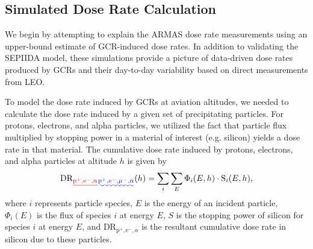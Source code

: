 \documentclass[draft]{agujournal2019}
\providecommand{\DIFadd}[1]{{\protect\color{blue}\uwave{#1}}} %
\providecommand{\DIFdel}[1]{{\protect\color{red}\sout{#1}}}                      %
\providecommand{\DIFaddbegin}{} %
\providecommand{\DIFaddend}{} %
\providecommand{\DIFdelbegin}{} %
\providecommand{\DIFdelend}{} %
\newcommand{\DIFscaledelfig}{0.5}
\newlength{\DIFdelgraphicswidth} %
\newlength{\DIFdelgraphicsheight} %
\newcommand{\DIFaddincludegraphics}[2][]{{\color{blue}\fbox{\DIFOincludegraphics[#1]{#2}}}} %
\newcommand{\DIFdelincludegraphics}[2][]{%
\sbox{\DIFdelgraphicsbox}{\DIFOincludegraphics[#1]{#2}}%
\settoboxwidth{\DIFdelgraphicswidth}{\DIFdelgraphicsbox} %
\settoboxtotalheight{\DIFdelgraphicsheight}{\DIFdelgraphicsbox} %
\scalebox{\DIFscaledelfig}{%
\parbox[b]{\DIFdelgraphicswidth}{\usebox{\DIFdelgraphicsbox}\\[-\baselineskip] \rule{\DIFdelgraphicswidth}{0em}}\llap{\resizebox{\DIFdelgraphicswidth}{\DIFdelgraphicsheight}{%
\setlength{\unitlength}{\DIFdelgraphicswidth}%
\begin{picture}(1,1)%
\thicklines\linethickness{2pt} %
{\color[rgb]{1,0,0}\put(0,0){\framebox(1,1){}}}%
{\color[rgb]{1,0,0}\put(0,0){\line( 1,1){1}}}%
{\color[rgb]{1,0,0}\put(0,1){\line(1,-1){1}}}%
\end{picture}%
}\hspace*{3pt}}} %
} %
\DeclareRobustCommand{\DIFaddbegin}{\DIFOaddbegin \let\includegraphics\DIFaddincludegraphics} %
\DeclareRobustCommand{\DIFaddend}{\DIFOaddend \let\includegraphics\DIFOincludegraphics} %
\DeclareRobustCommand{\DIFdelbegin}{\DIFOdelbegin \let\includegraphics\DIFdelincludegraphics} %
\DeclareRobustCommand{\DIFdelend}{\DIFOaddend \let\includegraphics\DIFOincludegraphics} %
\begin{document}
\subsection{Simulated Dose Rate Calculation}
\label{section:model:doserate_conversion}
We begin by attempting to explain the ARMAS dose rate measurements using an upper-bound estimate of GCR-induced dose rates. In addition to validating the SEPIIDA model, these simulations provide a picture of data-driven dose rates produced by GCRs and their day-to-day variability based on direct measurements from LEO.

To model the dose rate induced by GCRs at aviation altitudes, we needed to calculate the dose rate induced by a given set of precipitating particles. For protons, electrons, \DIFaddbegin \DIFadd{muons, }\DIFaddend and alpha particles, we utilized the fact that particle flux multiplied by stopping power in a material of interest (e.g. silicon) yields a dose rate in that material. The cumulative dose rate induced by protons, electrons, \DIFaddbegin \DIFadd{muons, }\DIFaddend and alpha particles at altitude $h$ is given by
%
\begin{equation}
  \text{DR}\DIFdelbegin \DIFdel{_{\text{p}^+,\text{e}^-,\alpha}}\DIFdelend \DIFaddbegin \DIFadd{_{\text{p}^+,\text{e}^-,\mu^-,\alpha}}\DIFaddend (h) = \sum_i \sum_E \Phi_i(E,h) \cdot \text{S}_i(E,h),
\end{equation}
%
\noindent where $i$ represents particle species, $E$ is the energy of an incident particle, $\Phi_i(E)$ is the flux of species $i$ at energy $E$, $S$ is the stopping power of silicon for species $i$ at energy $E$, and DR\DIFdelbegin \DIFdel{$_{\text{p}^+,\text{e}^-,\alpha}$ }\DIFdelend \DIFaddbegin \DIFadd{$_{\text{p}^+,\text{e}^-,\mu^-,\alpha}$ }\DIFaddend is the resultant cumulative dose rate in silicon due to these particles.
\end{document}

